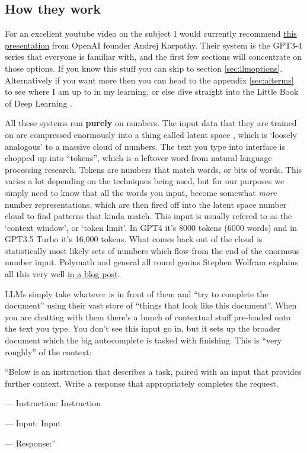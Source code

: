 \subsection{How they work}
For an excellent youtube video on the subject I would currently recommend \href{}{this presentation} from OpenAI founder Andrej Karpathy. Their system is the GPT3-4 series that everyone is familiar with, and the first few sections will concentrate on those options. If you know this stuff you can skip to section \ref{sec:llmoptions}. Alternatively if you want more then you can head to the appendix \ref{sec:aiterms} to see where I am up to in my learning, or else dive straight into the Little Book of Deep Learning \cite{fleuret2023little}. \par
All these systems run \textbf{purely} on numbers. The input data that they are trained on are compressed enormously into a thing called latent space \cite{DBLP:journals/corr/abs-2112-04895}, which is `loosely analogous' to a massive cloud of numbers. The text you type into interface is chopped up into ``tokens'', which is a leftover word from natural language processing research. Tokens are numbers that match words, or bits of words. This varies a lot depending on the techniques being used, but for our purposes we simply need to know that all the words you input, become somewhat \textit{more} number representations, which are then fired off into the latent space number cloud to find patterns that kinda match. This input is usually refered to as the `context window', or `token limit'. In GPT4 it's 8000 tokens (6000 words) and in GPT3.5 Turbo it's 16,000 tokens.  What comes back out of the cloud is statistically most likely sets of numbers which flow from the end of the enormous number input. Polymath and general all round genius Stephen Wolfram explains all this very well \href{https://writings.stephenwolfram.com/2023/02/what-is-chatgpt-doing-and-why-does-it-work/}{in a blog post}.\par
LLMs simply take whatever is in front of them and ``try to complete the document'' using their vast store of ``things that look like this document''. When you are chatting with them there's a bunch of contextual stuff pre-loaded onto the text you type. You don't see this input go in, but it sets up the broader document which the big autocomplete is tasked with finishing. This is ``very roughly'' of the context:
\begin{tcolorbox}[enhanced, frame style={fill=lightgray}, interior style={fill=lightgray}]
``Below is an instruction that describes a task, paired with an input that provides further context. Write a response that appropriately completes the request.

--- Instruction:
Instruction

--- Input:
Input

--- Response:''
\end{tcolorbox}
